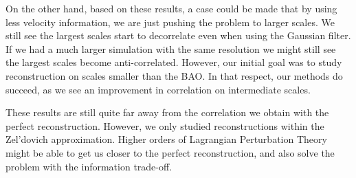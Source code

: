 On the other hand, based on these results, a case could be made that by using less velocity information, we are just pushing the problem to larger scales. We still see the largest scales start to decorrelate even when using the Gaussian filter. If we had a much larger simulation with the same resolution we might still see the largest scales become anti-correlated. However, our initial goal was to study reconstruction on scales smaller than the BAO. In that respect, our methods do succeed, as we see an improvement in correlation on intermediate scales.

These results are still quite far away from the correlation we obtain with the perfect reconstruction. However, we only studied reconstructions within the Zel'dovich approximation. Higher orders of Lagrangian Perturbation Theory might be able to get us closer to the perfect reconstruction, and also solve the problem with the information trade-off. 

    
    
